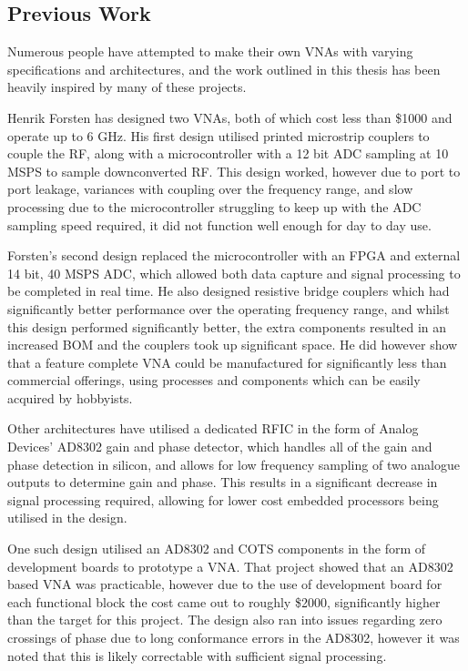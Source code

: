 \newpage
\subsection{Previous Work}
Numerous people have attempted to make their own VNAs with varying specifications and architectures, and the work outlined in this thesis has been heavily inspired by many of these projects. 

Henrik Forsten has designed two VNAs, both of which cost less than \$1000 and operate up to 6 GHz. His first design \cite{henrik_1} utilised printed microstrip couplers to couple the RF, along with a microcontroller with a 12 bit ADC sampling at 10 MSPS to sample downconverted RF. This design worked, however due to port to port leakage, variances with coupling over the frequency range, and slow processing due to the microcontroller struggling to keep up with the ADC sampling speed required, it did not function well enough for day to day use.  

Forsten's second design \cite{henrik_2} replaced the microcontroller with an FPGA and external 14 bit, 40 MSPS ADC, which allowed both data capture and signal processing to be completed in real time. He also designed resistive bridge couplers which had significantly better performance over the operating frequency range, and whilst this design performed significantly better, the extra components resulted in an increased BOM and the couplers took up significant space. He did however show that a feature complete VNA could be manufactured for significantly less than commercial offerings, using processes and components which can be easily acquired by hobbyists.  

Other architectures have utilised a dedicated RFIC in the form of Analog Devices' AD8302 gain and phase detector, which handles all of the gain and phase detection in silicon, and allows for low frequency sampling of two analogue outputs to determine gain and phase. This results in a significant decrease in signal processing required, allowing for lower cost embedded processors being utilised in the design. 

One such design \cite{nagy_vna} utilised an AD8302 and COTS components in the form of development boards to prototype a VNA. That project showed that an AD8302 based VNA was practicable, however due to the use of development board for each functional block the cost came out to roughly \$2000, significantly higher than the target for this project. The design also ran into issues regarding zero crossings of phase due to long conformance errors in the AD8302, however it was noted that this is likely correctable with sufficient signal processing.  

